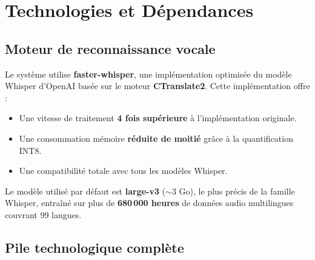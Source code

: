 \documentclass[12pt,a4paper]{report}
\begin{document}
\chapter{Technologies et Dépendances}

\section{Moteur de reconnaissance vocale}

Le système utilise \textbf{faster-whisper}, une implémentation optimisée du modèle Whisper d'OpenAI basée sur le moteur \textbf{CTranslate2}. Cette implémentation offre :

\begin{itemize}
    \item Une vitesse de traitement \textbf{4 fois supérieure} à l'implémentation originale.
    \item Une consommation mémoire \textbf{réduite de moitié} grâce à la quantification INT8.
    \item Une compatibilité totale avec tous les modèles Whisper.
\end{itemize}

Le modèle utilisé par défaut est \textbf{large-v3} ($\sim$3 Go), le plus précis de la famille Whisper, entraîné sur plus de \textbf{680\,000 heures} de données audio multilingues couvrant 99 langues.

\section{Pile technologique complète}
\end{document}
